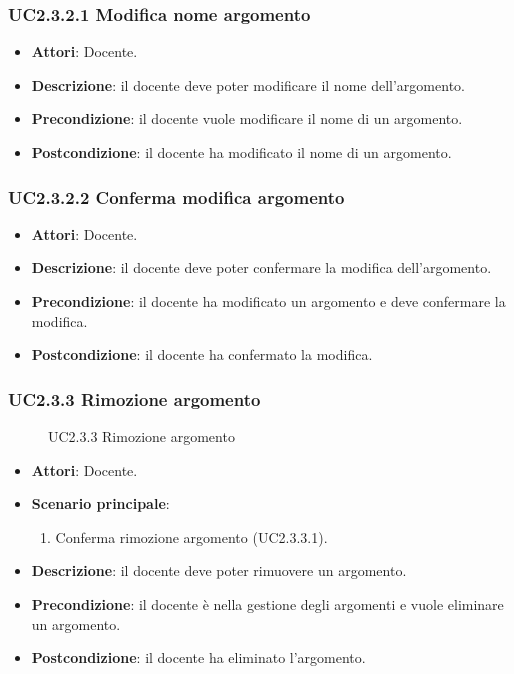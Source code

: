 \subsubsection{UC2.3.2.1 Modifica nome argomento}
\begin{itemize}
\item \textbf{Attori}: Docente.
\item \textbf{Descrizione}: il docente deve poter modificare il nome dell'argomento.
\item \textbf{Precondizione}: il docente vuole modificare il nome di un argomento.
\item \textbf{Postcondizione}: il docente ha modificato il nome di un argomento.
\end{itemize}
\subsubsection{UC2.3.2.2 Conferma modifica argomento}
\begin{itemize}
\item \textbf{Attori}: Docente.
\item \textbf{Descrizione}: il docente deve poter confermare la modifica dell'argomento.
\item \textbf{Precondizione}: il docente ha modificato un argomento e deve confermare la modifica.
\item \textbf{Postcondizione}: il docente ha confermato la modifica.
\end{itemize}
\subsubsection{UC2.3.3 Rimozione argomento}
\begin{figure}[H]
\centering
\noindent{}
\caption{UC2.3.3 Rimozione argomento}
\end{figure}
\begin{itemize}
\item \textbf{Attori}: Docente.
\item \textbf{Scenario principale}:
\begin{enumerate}
\item Conferma rimozione argomento (UC2.3.3.1).
\end{enumerate}
\item \textbf{Descrizione}: il docente deve poter rimuovere un argomento.
\item \textbf{Precondizione}: il docente è nella gestione degli argomenti e vuole eliminare un argomento.
\item \textbf{Postcondizione}: il docente ha eliminato l'argomento.
\end{itemize}
